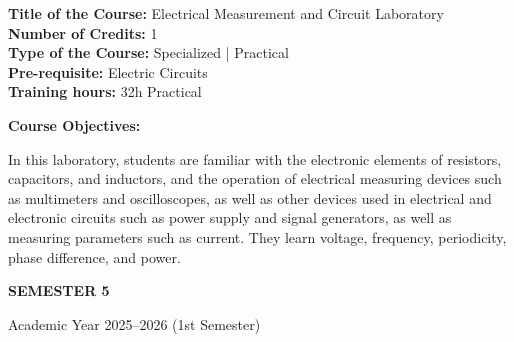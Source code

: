 \documentclass[12pt,a4paper]{article}
\begin{document}
\newpage
\textbf{Title of the Course:} Electrical Measurement and Circuit Laboratory\\
\textbf{Number of Credits:} 1\\
\textbf{Type of the Course:} Specialized | Practical\\
\textbf{Pre-requisite:} Electric Circuits\\
\textbf{Training hours:} 32h Practical\par\vspace{4pt}
\textbf{Course Objectives:}\par\vspace{2pt}
In this laboratory, students are familiar with the electronic elements of resistors, capacitors, and
inductors, and the operation of electrical measuring devices such as multimeters and oscilloscopes,
as well as other devices used in electrical and electronic circuits such as power supply and signal
generators, as well as measuring parameters such as current. They learn voltage, frequency,
periodicity, phase difference, and power.\par\vspace{4pt}

\newpage
\vspace*{\fill}
\begin{center}
  {\fontsize{28pt}{34pt}\selectfont \textbf{SEMESTER 5}}\par\vspace{12pt}
  {\fontsize{13pt}{17pt}\selectfont Academic Year 2025–2026 (1st Semester)}
\end{center}
\vspace*{\fill}
\end{document}
